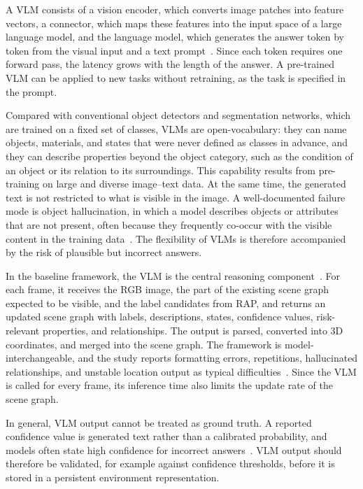 {{{\small

A VLM consists of a vision encoder, which converts image patches into feature vectors, a connector, which maps these features into the input space of a large language model, and the language model, which generates the answer token by token from the visual input and a text prompt~\cite{liu2023llava}. Since each token requires one forward pass, the latency grows with the length of the answer. A pre-trained VLM can be applied to new tasks without retraining, as the task is specified in the prompt.

Compared with conventional object detectors and segmentation networks, which are trained on a fixed set of classes, VLMs are open-vocabulary: they can name objects, materials, and states that were never defined as classes in advance, and they can describe properties beyond the object category, such as the condition of an object or its relation to its surroundings. This capability results from pre-training on large and diverse image--text data. At the same time, the generated text is not restricted to what is visible in the image. A well-documented failure mode is object hallucination, in which a model describes objects or attributes that are not present, often because they frequently co-occur with the visible content in the training data~\cite{li2023pope}. The flexibility of VLMs is therefore accompanied by the risk of plausible but incorrect answers.

In the baseline framework, the VLM is the central reasoning component~\cite{previous_rsg_thesis}. For each frame, it receives the RGB image, the part of the existing scene graph expected to be visible, and the label candidates from RAP, and returns an updated scene graph with labels, descriptions, states, confidence values, risk-relevant properties, and relationships. The output is parsed, converted into 3D coordinates, and merged into the scene graph. The framework is model-interchangeable, and the study reports formatting errors, repetitions, hallucinated relationships, and unstable location output as typical difficulties~\cite{previous_rsg_thesis}. Since the VLM is called for every frame, its inference time also limits the update rate of the scene graph.

In general, VLM output cannot be treated as ground truth. A reported confidence value is generated text rather than a calibrated probability, and models often state high confidence for incorrect answers~\cite{xiong2024uncertainty}. VLM output should therefore be validated, for example against confidence thresholds, before it is stored in a persistent environment representation.

}}}
